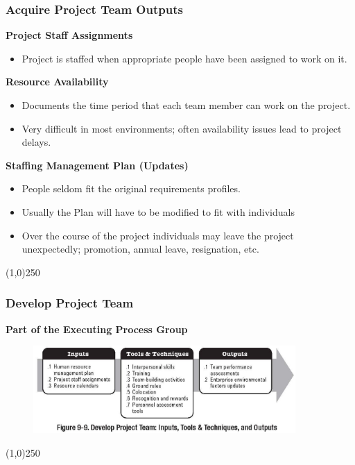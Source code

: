  
\begin{frame}
\frametitle{Acquire Project Team \hfill Outputs}
\textbf{Project Staff Assignments}
		\begin{itemize}
			\item Project is staffed when appropriate people have been assigned to work on it.
		\end{itemize}
\textbf{Resource Availability}
		\begin{itemize}
			\item Documents the time period that each team member can work on the project.
			\item Very difficult in most environments; often availability issues lead to project delays.
		\end{itemize}
\textbf{Staffing Management Plan (Updates)}
		\begin{itemize}
			\item People seldom fit the original requirements profiles.
			\item Usually the Plan will have to be modified to fit with individuals
			\item Over the course of the project individuals may leave the project unexpectedly; promotion, annual leave, resignation, etc.
		\end{itemize}
\end{frame}\begin{center}\line(1,0){250}\end{center}
 


 
\begin{frame}
\frametitle{Develop Project Team}
\textbf{Part of the Executing Process Group}
\begin{figure}
	\centering
		\includegraphics[width = 10cm]{images/Fig9-9.jpg}
	\label{fig:9-9}
\end{figure}
\end{frame}\begin{center}\line(1,0){250}\end{center}


 
 
